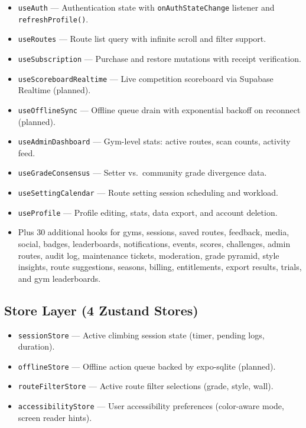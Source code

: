 \documentclass[12pt,a4paper]{report}
\renewcommand\_{\textunderscore\hspace{0pt}}
\begin{document}
\begin{itemize}[noitemsep]
    \item \texttt{useAuth} --- Authentication state with \texttt{onAuthStateChange} listener and \texttt{refreshProfile()}.
    \item \texttt{useRoutes} --- Route list query with infinite scroll and filter support.
    \item \texttt{useSubscription} --- Purchase and restore mutations with receipt verification.
    \item \texttt{useScoreboardRealtime} --- Live competition scoreboard via Supabase Realtime (planned).
    \item \texttt{useOfflineSync} --- Offline queue drain with exponential backoff on reconnect (planned).
    \item \texttt{useAdminDashboard} --- Gym-level stats: active routes, scan counts, activity feed.
    \item \texttt{useGradeConsensus} --- Setter vs.\ community grade divergence data.
    \item \texttt{useSettingCalendar} --- Route setting session scheduling and workload.
    \item \texttt{useProfile} --- Profile editing, stats, data export, and account deletion.
    \item Plus 30 additional hooks for gyms, sessions, saved routes, feedback, media, social, badges, leaderboards, notifications, events, scores, challenges, admin routes, audit log, maintenance tickets, moderation, grade pyramid, style insights, route suggestions, seasons, billing, entitlements, export results, trials, and gym leaderboards.
\end{itemize}

\subsection{Store Layer (4 Zustand Stores)}

\begin{itemize}[noitemsep]
    \item \texttt{sessionStore} --- Active climbing session state (timer, pending logs, duration).
    \item \texttt{offlineStore} --- Offline action queue backed by expo-sqlite (planned).
    \item \texttt{routeFilterStore} --- Active route filter selections (grade, style, wall).
    \item \texttt{accessibilityStore} --- User accessibility preferences (color-aware mode, screen reader hints).
\end{itemize}
\end{document}
